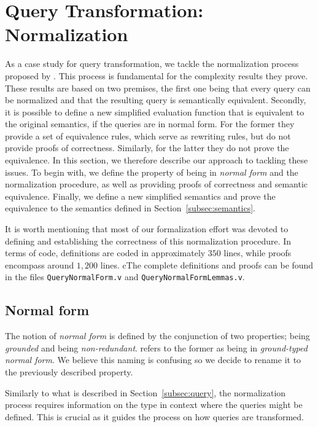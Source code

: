 \section{Query Transformation: Normalization}\label{sec:norm}

As a case study for query transformation, we tackle the normalization process proposed by \HP{}. This process is fundamental for the complexity results they prove. These results are based on two premises, the first one being that every query can be normalized and that the resulting query is semantically equivalent. Secondly, it is possible to define a new simplified evaluation function that is equivalent to the original semantics, if the queries are in normal form. For the former they provide a set of equivalence rules, which serve as rewriting rules, but do not provide proofs of correctness. Similarly, for the latter they do not prove the equivalence. In this section, we therefore describe our approach to tackling these issues. To begin with, we define the property of being in \textit{normal form} and the normalization procedure, as well as providing proofs of correctness and semantic equivalence. Finally, we define a new simplified semantics and prove the equivalence to the semantics defined in Section~\ref{subsec:semantics}.

It is worth mentioning that most of our formalization effort was devoted to defining and establishing the correctness of this normalization procedure. In terms of code, definitions are coded in approximately $350$ lines, while proofs encompass around $1,200$ lines. cThe complete definitions and proofs can be found in the files \texttt{QueryNormalForm.v} and \texttt{QueryNormalFormLemmas.v}.

\subsection{Normal form}

The notion of \textit{normal form} is defined by the conjunction of two properties; being \textit{grounded} and being \textit{non-redundant}.
\HP{} refers to the former as being in \textit{ground-typed normal form}. We believe this naming is confusing so we decide to rename it to the previously described property.

Similarly to what is described in Section~\ref{subsec:query}, the normalization process requires information on the type in context where the queries might be defined. This is crucial as it guides the process on how queries are transformed.

